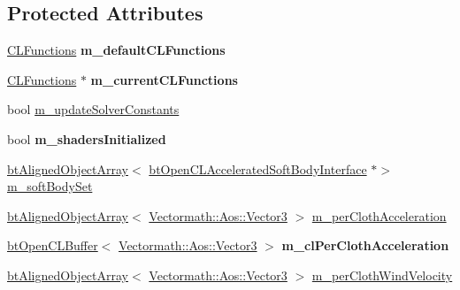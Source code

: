 \subsection*{Protected Attributes}
\begin{DoxyCompactItemize}
\item 
\mbox{\label{classbtOpenCLSoftBodySolver_aaab909130301ef8b5e16e5069f4aeb2d}} 
\hyperlink{classCLFunctions}{C\+L\+Functions} {\bfseries m\+\_\+default\+C\+L\+Functions}
\item 
\mbox{\label{classbtOpenCLSoftBodySolver_ad5b1e3286b6027afbc58b2f5e4f0523d}} 
\hyperlink{classCLFunctions}{C\+L\+Functions} $\ast$ {\bfseries m\+\_\+current\+C\+L\+Functions}
\item 
bool \hyperlink{classbtOpenCLSoftBodySolver_a44c3d62831247081f6e79ac1c0b5fff7}{m\+\_\+update\+Solver\+Constants}
\item 
\mbox{\label{classbtOpenCLSoftBodySolver_a3d86d42b8e02bfe4229744ed58da7c79}} 
bool {\bfseries m\+\_\+shaders\+Initialized}
\item 
\hyperlink{classbtAlignedObjectArray}{bt\+Aligned\+Object\+Array}$<$ \hyperlink{classbtOpenCLAcceleratedSoftBodyInterface}{bt\+Open\+C\+L\+Accelerated\+Soft\+Body\+Interface} $\ast$$>$ \hyperlink{classbtOpenCLSoftBodySolver_add8793b08e702377d6c5eff04573ed38}{m\+\_\+soft\+Body\+Set}
\item 
\hyperlink{classbtAlignedObjectArray}{bt\+Aligned\+Object\+Array}$<$ \hyperlink{classVectormath_1_1Aos_1_1Vector3}{Vectormath\+::\+Aos\+::\+Vector3} $>$ \hyperlink{classbtOpenCLSoftBodySolver_ac958100c16c9c92b08cf2f6066697990}{m\+\_\+per\+Cloth\+Acceleration}
\item 
\mbox{\label{classbtOpenCLSoftBodySolver_a2779629cde22ad0e2e4ac41af05838f7}} 
\hyperlink{classbtOpenCLBuffer}{bt\+Open\+C\+L\+Buffer}$<$ \hyperlink{classVectormath_1_1Aos_1_1Vector3}{Vectormath\+::\+Aos\+::\+Vector3} $>$ {\bfseries m\+\_\+cl\+Per\+Cloth\+Acceleration}
\item 
\hyperlink{classbtAlignedObjectArray}{bt\+Aligned\+Object\+Array}$<$ \hyperlink{classVectormath_1_1Aos_1_1Vector3}{Vectormath\+::\+Aos\+::\+Vector3} $>$ \hyperlink{classbtOpenCLSoftBodySolver_a35942277432e994af4343e05746badf6}{m\+\_\+per\+Cloth\+Wind\+Velocity}
\item 
$$
\end{DoxyCompactItemize}
